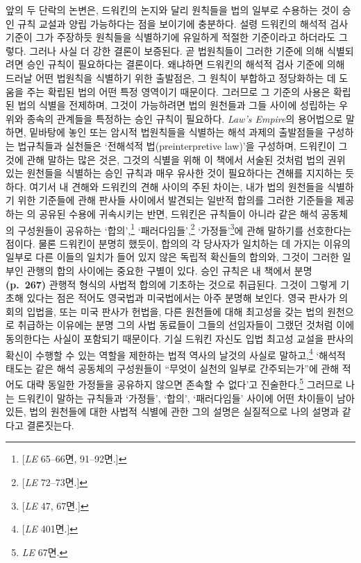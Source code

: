 앞의 두 단락의 논변은, 드워킨의 논지와 달리 원칙들을 법의 일부로
수용하는 것이 승인 규칙 교설과 양립 가능하다는 점을 보이기에 충분하다.
설령 드워킨의 해석적 검사 기준이 그가 주장하듯 원칙들을 식별하기에
유일하게 적절한 기준이라고 하더라도 그렇다. 그러나 사실 더 강한 결론이
보증된다. 곧 법원칙들이 그러한 기준에 의해 식별되려면 승인 규칙이
필요하다는 결론이다. 왜냐하면 드워킨의 해석적 검사 기준에 의해 드러날
어떤 법원칙을 식별하기 위한 출발점은, 그 원칙이 부합하고 정당화하는 데
도움을 주는 확립된 법의 어떤 특정 영역이기 때문이다. 그러므로 그 기준의
사용은 확립된 법의 식별을 전제하며, 그것이 가능하려면 법의 원천들과 그들
사이에 성립하는 우위와 종속의 관계들을 특정하는 승인 규칙이 필요하다.
\emph{Law's Empire}의 용어법으로 말하면, 밑바탕에 놓인 또는 암시적
법원칙들을 식별하는 해석 과제의 출발점들을 구성하는 법규칙들과 실천들은
‘전해석적 법(preinterpretive law)’을 구성하며, 드워킨이 그것에 관해
말하는 많은 것은, 그것의 식별을 위해 이 책에서 서술된 것처럼 법의 권위
있는 원천들을 식별하는 승인 규칙과 매우 유사한 것이 필요하다는 견해를
지지하는 듯하다. 여기서 내 견해와 드워킨의 견해 사이의 주된 차이는, 내가
법의 원천들을 식별하기 위한 기준들에 관해 판사들 사이에서 발견되는
일반적 합의를 그러한 기준들을 제공하는 의 공유된 수용에
귀속시키는 반면, 드워킨은 규칙들이 아니라 같은 해석 공동체의 구성원들이
공유하는 ‘합의’,\footnote{{[}\emph{LE} 65--66면, 91--92면.{]}}
‘패러다임들’,\footnote{{[}\emph{LE} 72--73면.{]}} ‘가정들’\footnote{{[}\emph{LE}
  47, 67면.{]}}에 관해 말하기를 선호한다는 점이다. 물론 드워킨이 분명히
했듯이, 합의의 각 당사자가 일치하는 데 가지는 이유의 일부로 다른 이들의
일치가 들어 있지 않은 독립적 확신들의 합의와, 그것이 그러한 일부인
관행의 합의 사이에는 중요한 구별이 있다. 승인 규칙은 내 책에서 분명
\textbf{(p.~267)} 관행적 형식의 사법적 합의에 기초하는 것으로 취급된다.
그것이 그렇게 기초해 있다는 점은 적어도 영국법과 미국법에서는 아주
분명해 보인다. 영국 판사가 의회의 입법을, 또는 미국 판사가 헌법을, 다른
원천들에 대해 최고성을 갖는 법의 원천으로 취급하는 이유에는 분명 그의
사법 동료들이 그들의 선임자들이 그랬던 것처럼 이에 동의한다는 사실이
포함되기 때문이다. 기실 드워킨 자신도 입법 최고성 교설을 판사의 확신이
수행할 수 있는 역할을 제한하는 법적 역사의 날것의 사실로
말하고,\footnote{{[}\emph{LE} 401면.{]}} ‘해석적 태도는 같은 해석
공동체의 구성원들이 “무엇이 실천의 일부로 간주되는가”에 관해 적어도
대략 동일한 가정들을 공유하지 않으면 존속할 수 없다’고
진술한다.\footnote{\emph{LE} 67면.} 그러므로 나는 드워킨이 말하는
규칙들과 ‘가정들’, ‘합의’, ‘패러다임들’ 사이에 어떤 차이들이 남아 있든,
법의 원천들에 대한 사법적 식별에 관한 그의 설명은 실질적으로 나의 설명과
같다고 결론짓는다.

